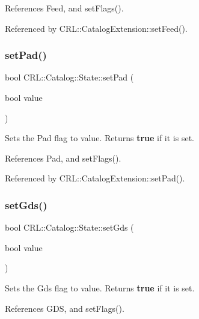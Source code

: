 References Feed, and set\+Flags().



Referenced by C\+R\+L\+::\+Catalog\+Extension\+::set\+Feed().

\mbox{\label{classCRL_1_1Catalog_1_1State_a97e2158809ed0e88237bb92eb8daa290}} 
\subsubsection{\texorpdfstring{set\+Pad()}{setPad()}}
{\footnotesize\ttfamily bool C\+R\+L\+::\+Catalog\+::\+State\+::set\+Pad (\begin{DoxyParamCaption}\item[{bool}]{value }\end{DoxyParamCaption})\hspace{0.3cm}{\ttfamily [inline]}}

Sets the Pad flag to {\ttfamily value}. Returns {\bfseries true} if it is set. 

References Pad, and set\+Flags().



Referenced by C\+R\+L\+::\+Catalog\+Extension\+::set\+Pad().

\mbox{\label{classCRL_1_1Catalog_1_1State_acc0c819f382393dc780bb19c7788b216}} 
\subsubsection{\texorpdfstring{set\+Gds()}{setGds()}}
{\footnotesize\ttfamily bool C\+R\+L\+::\+Catalog\+::\+State\+::set\+Gds (\begin{DoxyParamCaption}\item[{bool}]{value }\end{DoxyParamCaption})\hspace{0.3cm}{\ttfamily [inline]}}

Sets the Gds flag to {\ttfamily value}. Returns {\bfseries true} if it is set. 

References G\+DS, and set\+Flags().



